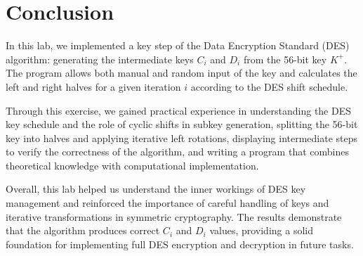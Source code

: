 \documentclass[12pt]{article}
\begin{document}
\section*{Conclusion}
\hspace{0.8cm}

In this lab, we implemented a key step of the Data Encryption Standard (DES) algorithm: generating the intermediate keys \(C_i\) and \(D_i\) from the 56-bit key \(K^{+}\). The program allows both manual and random input of the key and calculates the left and right halves for a given iteration \(i\) according to the DES shift schedule.

Through this exercise, we gained practical experience in understanding the DES key schedule and the role of cyclic shifts in subkey generation, splitting the 56-bit key into halves and applying iterative left rotations, displaying intermediate steps to verify the correctness of the algorithm, and writing a program that combines theoretical knowledge with computational implementation.

Overall, this lab helped us understand the inner workings of DES key management and reinforced the importance of careful handling of keys and iterative transformations in symmetric cryptography. The results demonstrate that the algorithm produces correct \(C_i\) and \(D_i\) values, providing a solid foundation for implementing full DES encryption and decryption in future tasks.





\pagebreak
\end{document}
